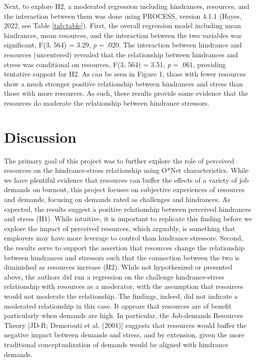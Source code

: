 \documentclass[
  man]{apa6}
\begin{document}
Next, to explore H2, a moderated regression including hindrances, resources, and the interaction between them was done using PROCESS, version 4.1.1 (Hayes, 2022, see Table \ref{tab:table}). First, the overall regression model including mean hindrances, mean resources, and the interaction between the two variables was significant, F(3, 564) = 3.29, \emph{p} = .020. The interaction between hindrance and resources (uncentered) revealed that the relationship between hindrances and stress was conditional on resources, F(3, 564) = 3.51, \emph{p} = .061, providing tentative support for H2. As can be seen in Figure 1, those with fewer resources show a much stronger positive relationship between hindrances and stress than those with more resources. As such, these results provide some evidence that the resources do moderate the relationship between hindrance stressors.

\hypertarget{discussion}{%
\section{Discussion}\label{discussion}}

The primary goal of this project was to further explore the role of perceived resources on the hindrance-stress relationship using O*Net characteristics. While we have plentiful evidence that resources can buffer the effects of a variety of job demands on burnout, this project focuses on subjective experiences of resources and demands, focusing on demands rated as challenges and hindrances. As expected, the results suggest a positive relationship between perceived hindrances and stress (H1). While intuitive, it is important to replicate this finding before we explore the impact of perceived resources, which arguably, is something that employers may have more leverage to control than hindrance stressors. Second, the results serve to support the assertion that resources change the relationship between hindrances and stressors such that the connection between the two is diminished as resources increase (H2). While not hypothesized or presented above, the authors did run a regression on the challenge hindrance-stress relationship with resources as a moderator, with the assumption that resources would not moderate the relationship. The findings, indeed, did not indicate a moderated relationship in this case. It appears that resources are of benefit particularly when demands are high. In particular, the Job-demands Resources Theory {[}JD-R; Demerouti et al. (2001){]} suggests that resources would buffer the negative impact between demands and stress, and by extension, given the more traditional conceptualization of demands would be aligned with hindrance demands.
\end{document}
